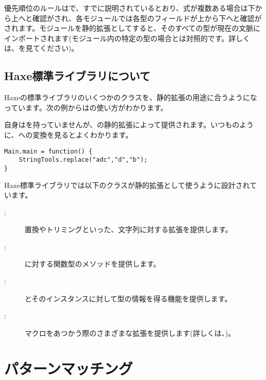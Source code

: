 優先順位のルールはで、すでに説明されているとおり、式が複数ある場合は下から上へと確認がされ、各モジュールでは各型のフィールドが上から下へと確認がされます。モジュールを静的拡張としてすると、そのすべての型が現在の文脈にインポートされます(モジュール内の特定の型の場合とは対照的です。詳しくは、を見てください)。

\subsection{Haxe標準ライブラリについて}
\label{lf-static-extension-in-std}

Haxeの標準ライブラリのいくつかのクラスを、静的拡張の用途に合うようになっています。次の例からはの使い方がわかります。


自身はを持っていませんが、の静的拡張によって提供されます。いつものように、への変換を見るとよくわかります。

\begin{lstlisting}
Main.main = function() {
	StringTools.replace("adc","d","b");
}
\end{lstlisting}

Haxe標準ライブラリでは以下のクラスが静的拡張として使うように設計されています。

\begin{description}
	\item[:] 置換やトリミングといった、文字列に対する拡張を提供します。
	\item[:] に対する関数型のメソッドを提供します。　
	\item[:] とそのインスタンスに対して型の情報を得る機能を提供します。
	\item[:] マクロをあつかう際のさまざまな拡張を提供します(詳しくは、)。
\end{description}


\section{パターンマッチング}
\label{lf-pattern-matching}


